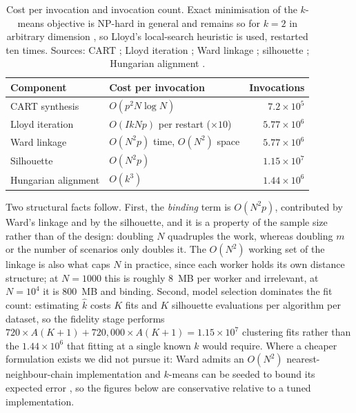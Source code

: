 \documentclass[pdflatex,referee]{sn-jnl}
\begin{document}
\begin{table}[!htbp]
\centering
\caption{Cost per invocation and invocation count. Exact minimisation of the
         $k$-means objective is NP-hard in general and remains so for $k = 2$
         in arbitrary dimension \citep{inaba1994}, so Lloyd's local-search
         heuristic \citep{lloyd1982} is used, restarted ten times. Sources:
         CART \citep{breiman1984}; Lloyd iteration
         \citep{macqueen1967,lloyd1982}; Ward linkage
         \citep{ward1963,murtagh2017}; silhouette \citep{rousseeuw1987};
         Hungarian alignment \citep{kuhn1955,jonker1987}.}
\label{tabS:complexity}
\small
\begin{tabular}{lp{4.2cm}r}
\toprule
Component & Cost per invocation & Invocations \\
\midrule
CART synthesis      & $O(p^{2} N \log N)$                      & $7.2 \times 10^{5}$ \\
Lloyd iteration     & $O(IkNp)$ per restart ($\times 10$)       & $5.77 \times 10^{6}$ \\
Ward linkage        & $O(N^{2} p)$ time, $O(N^{2})$ space      & $5.77 \times 10^{6}$ \\
Silhouette          & $O(N^{2} p)$                             & $1.15 \times 10^{7}$ \\
Hungarian alignment & $O(k^{3})$                               & $1.44 \times 10^{6}$ \\
\bottomrule
\end{tabular}
\end{table}

Two structural facts follow. First, the \emph{binding} term is $O(N^{2}p)$,
contributed by Ward's linkage and by the silhouette, and it is a property of the
sample size rather than of the design: doubling $N$ quadruples the work, whereas
doubling $m$ or the number of scenarios only doubles it. The $O(N^{2})$ working
set of the linkage is also what caps $N$ in practice, since each worker holds
its own distance structure; at $N = 1000$ this is roughly $8$~MB per worker and
irrelevant, at $N = 10^{4}$ it is $800$~MB and binding. Second, model selection
dominates the fit count: estimating $\hat{k}$ costs $K$ fits and $K$ silhouette
evaluations per algorithm per dataset, so the fidelity stage performs
$720 \times A(K{+}1) + 720{,}000 \times A(K{+}1) = 1.15 \times 10^{7}$
clustering fits rather than the $1.44 \times 10^{6}$ that fitting at a single
known $k$ would require. Where a cheaper formulation exists we did not pursue
it: Ward admits an $O(N^{2})$ nearest-neighbour-chain implementation
\citep{murtagh2017,mullner2011} and $k$-means can be seeded to bound its
expected error \citep{arthur2007}, so the figures below are conservative
relative to a tuned implementation.
\end{document}
